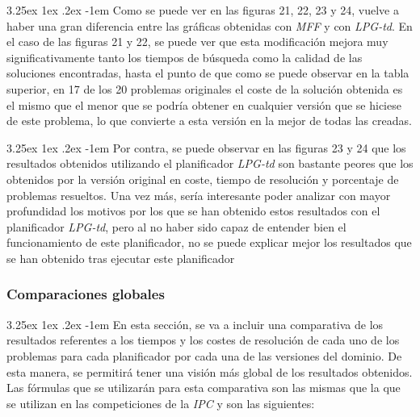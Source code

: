 \documentclass{article}
\makeatletter
\renewcommand\paragraph{\@startsection{paragraph}{5}{\z@}%
      {3.25ex \@plus1ex \@minus.2ex}%
      {-1em}%
      {\normalfont\normalsize\bfseries}}
\makeatother
\begin{document}
    \paragraph{}
    Como se puede ver en las figuras 21, 22, 23 y 24, vuelve a haber una gran diferencia entre las gráficas obtenidas con \textit{MFF} y con \textit{LPG-td}. En el caso de las figuras 21 y 22, se puede ver que esta modificación mejora muy significativamente tanto los tiempos de búsqueda como la calidad de las soluciones encontradas, hasta el punto de que como se puede observar en la tabla superior, en 17 de los 20 problemas originales el coste de la solución obtenida es el mismo que el menor que se podría obtener en cualquier versión que se hiciese de este problema, lo que convierte a esta versión en la mejor de todas las creadas.
    
    \paragraph{}
    Por contra, se puede observar en las figuras 23 y 24 que los resultados obtenidos utilizando el planificador \textit{LPG-td} son bastante peores que los obtenidos por la versión original en coste, tiempo de resolución y porcentaje de problemas resueltos. Una vez más, sería interesante poder analizar con mayor profundidad los motivos por los que se han obtenido estos resultados con el planificador \textit{LPG-td}, pero al no haber sido capaz de entender bien el funcionamiento de este planificador, no se puede explicar mejor los resultados que se han obtenido tras ejecutar este planificador
    
    \subsubsection{Comparaciones globales}
    \paragraph{}
    En esta sección, se va a incluir una comparativa de los resultados referentes a los tiempos y los costes de resolución de cada uno de los problemas para cada planificador por cada una de las versiones del dominio. De esta manera, se permitirá tener una visión más global de los resultados obtenidos. Las fórmulas que se utilizarán para esta comparativa son las mismas que la que se utilizan en las competiciones de la \textit{IPC} y son las siguientes: \\
    
\end{document}

